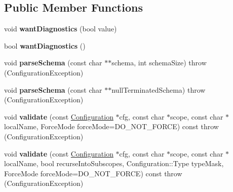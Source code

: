 \subsection*{Public Member Functions}
\begin{DoxyCompactItemize}
\item 
\hypertarget{classCONFIG4CPP__NAMESPACE_1_1SchemaValidator_a5dbbf5ecd6ee7969bf5889941084657b}{void {\bfseries want\-Diagnostics} (bool value)}\label{classCONFIG4CPP__NAMESPACE_1_1SchemaValidator_a5dbbf5ecd6ee7969bf5889941084657b}

\item 
\hypertarget{classCONFIG4CPP__NAMESPACE_1_1SchemaValidator_a23e2382ac47e69d12cc44d35e1de4352}{bool {\bfseries want\-Diagnostics} ()}\label{classCONFIG4CPP__NAMESPACE_1_1SchemaValidator_a23e2382ac47e69d12cc44d35e1de4352}

\item 
\hypertarget{classCONFIG4CPP__NAMESPACE_1_1SchemaValidator_a5b75f10c38f46aed325ebe1c222db25d}{void {\bfseries parse\-Schema} (const char $\ast$$\ast$schema, int schema\-Size)  throw (\-Configuration\-Exception)}\label{classCONFIG4CPP__NAMESPACE_1_1SchemaValidator_a5b75f10c38f46aed325ebe1c222db25d}

\item 
\hypertarget{classCONFIG4CPP__NAMESPACE_1_1SchemaValidator_a2eb075c6f649bedaafe38ff6e5c84f2f}{void {\bfseries parse\-Schema} (const char $\ast$$\ast$null\-Terminated\-Schema)  throw (\-Configuration\-Exception)}\label{classCONFIG4CPP__NAMESPACE_1_1SchemaValidator_a2eb075c6f649bedaafe38ff6e5c84f2f}

\item 
\hypertarget{classCONFIG4CPP__NAMESPACE_1_1SchemaValidator_a062b6b1e6444357a647c4e8c4a2e3b77}{void {\bfseries validate} (const \hyperlink{classCONFIG4CPP__NAMESPACE_1_1Configuration}{Configuration} $\ast$cfg, const char $\ast$scope, const char $\ast$local\-Name, Force\-Mode force\-Mode=D\-O\-\_\-\-N\-O\-T\-\_\-\-F\-O\-R\-C\-E) const   throw (\-Configuration\-Exception)}\label{classCONFIG4CPP__NAMESPACE_1_1SchemaValidator_a062b6b1e6444357a647c4e8c4a2e3b77}

\item 
\hypertarget{classCONFIG4CPP__NAMESPACE_1_1SchemaValidator_a1145a4d7ce20fe64ba9c51f8b6322b5b}{void {\bfseries validate} (const \hyperlink{classCONFIG4CPP__NAMESPACE_1_1Configuration}{Configuration} $\ast$cfg, const char $\ast$scope, const char $\ast$local\-Name, bool recurse\-Into\-Subscopes, Configuration\-::\-Type type\-Mask, Force\-Mode force\-Mode=D\-O\-\_\-\-N\-O\-T\-\_\-\-F\-O\-R\-C\-E) const   throw (\-Configuration\-Exception)}\label{classCONFIG4CPP__NAMESPACE_1_1SchemaValidator_a1145a4d7ce20fe64ba9c51f8b6322b5b}

\end{DoxyCompactItemize}
